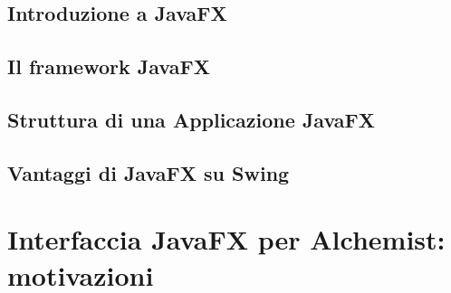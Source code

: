     \subsection{Introduzione a JavaFX}\label{sub:jfxIntro}
    \subsection{Il framework JavaFX}\label{sub:jfxFramework}
    \subsection{Struttura di una Applicazione JavaFX}\label{sub:jfxStruttura}
    \subsection{Vantaggi di JavaFX su Swing}\label{sub:jfxVantaggi}
  \section{Interfaccia JavaFX per Alchemist: motivazioni}\label{sec:motivi}
